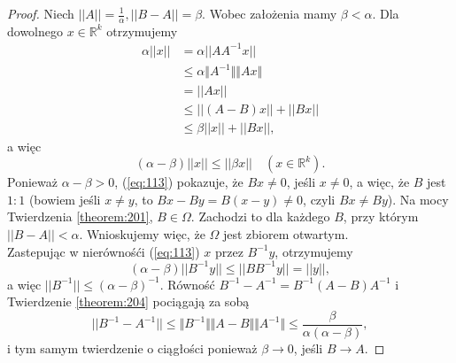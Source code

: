 \documentclass[leqno]{article}
\begin{document}
\begin{justify}
\begin{proof}
    Niech $||A|| = \frac{1}{\alpha}, ||B - A|| = \beta$. Wobec założenia mamy $\beta < \alpha$.
    Dla dowolnego $x \in \mathbb{R}^k$ otrzymujemy 
    \begin{align*}
        \alpha ||x|| &= \alpha || A A^{-1} x || \\ 
                     &\leqslant \alpha \Vert A^{-1} \Vert \Vert A x \Vert \\
                     &= ||A x || \\
                     &\leqslant ||(A - B)x|| + ||B x|| \\
                     &\leqslant \beta ||x|| + ||B x||,
    \end{align*}
    a więc 
    \begin{equation}\label{eq:113}
        (\alpha - \beta)||x|| \leqslant ||\beta x || \quad (x \in \mathbb{R}^k).
    \end{equation}
    Ponieważ $\alpha - \beta > 0$, (\ref{eq:113}) pokazuje, że $Bx \neq 0$, jeśli $x \neq 0$, a więc, że 
    $B$ jest $1 : 1$ (bowiem jeśli $x \neq y$, to $Bx - By = B(x - y) \neq 0$, czyli $Bx \neq By$). 
    Na mocy Twierdzenia \ref{theorem:201}, $B \in \Omega$. 
    Zachodzi to dla każdego $B$, przy którym $||B - A|| < \alpha$. Wnioskujemy więc, że $\Omega$ jest zbiorem otwartym. \\
    Zastepując w nierównośći (\ref{eq:113}) $x$ przez $B^{-1}y$, otrzymujemy 
    \[
        (\alpha - \beta)||B^{-1} y|| \leqslant ||B B^{-1} y|| = ||y||,
    \]
    a więc $||B^{-1}|| \leqslant {(\alpha - \beta)}^{-1}$. 
    Równość $B^{-1} - A^{-1} = B^{-1}(A - B)A^{-1}$ i Twierdzenie \ref{theorem:204} pociągają za sobą 
    \[
        ||B^{-1} - A^{-1}|| \leqslant \Vert B^{-1} \Vert \Vert A - B \Vert \Vert A^{-1} \Vert \leqslant \frac{\beta}{\alpha(\alpha - \beta)},
    \]
    i tym samym twierdzenie o ciągłości ponieważ $\beta \to 0$, jeśli $B \to A$.
\end{proof}


\end{justify}
\end{document}
